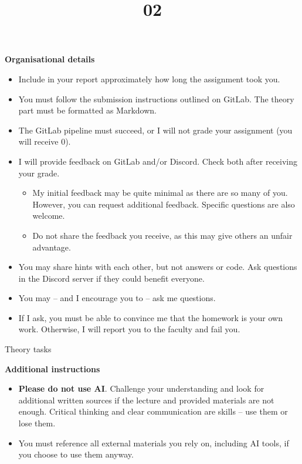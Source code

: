 \documentclass{homework}
\title{02}
\begin{document}
\maketitle

\textbf{Organisational details}

\begin{itemize}
  \item Include in your report approximately how long the assignment took you.
  \item You must follow the submission instructions outlined on GitLab.
  The theory part must be formatted as Markdown.
  \item The GitLab pipeline must succeed, or I will not grade your assignment (you will receive 0).
  \item I will provide feedback on GitLab and/or Discord.
  Check both after receiving your grade.
  \begin{itemize}
    \item My initial feedback may be quite minimal as there are so many of you.
    However, you can request additional feedback.
    Specific questions are also welcome.
    \item Do not share the feedback you receive, as this may give others an unfair advantage.
  \end{itemize}
  \item You may share hints with each other, but not answers or code.
  Ask questions in the Discord server if they could benefit everyone.
  \item You may -- and I encourage you to -- ask me questions.
  \item If I ask, you must be able to convince me that the homework is your own work.
  Otherwise, I will report you to the faculty and fail you.
\end{itemize}

\newpage

\begin{center}
  Theory tasks
\end{center}

\textbf{Additional instructions}

\begin{itemize}
  \item \textbf{Please do not use AI}.
  Challenge your understanding and look for additional written sources if the lecture and provided materials are not enough.
  Critical thinking and clear communication are skills -- use them or lose them.
  \item You must reference all external materials you rely on, including AI tools, if you choose to use them anyway.
\end{itemize}
\end{document}
